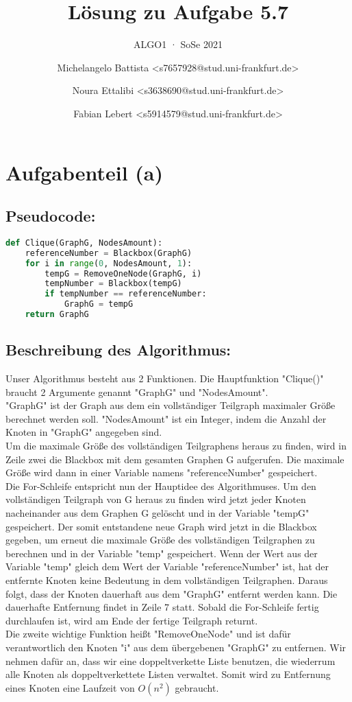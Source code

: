 \documentclass[a4paper,11pt,oneside]{scrartcl}
\subtitle{ALGO1 · SoSe 2021}
\title{Lösung zu Aufgabe 5.7}
\author{%
  Michelangelo Battista <s7657928@stud.uni-frankfurt.de>
  \and Noura Ettalibi <s3638690@stud.uni-frankfurt.de>\and 
Fabian Lebert <s5914579@stud.uni-frankfurt.de>
}
\begin{document}
\maketitle
\section*{Aufgabenteil (a)}
\subsection*{Pseudocode:}
\begin{lstlisting}[language=Python]
def Clique(GraphG, NodesAmount):
    referenceNumber = Blackbox(GraphG)
    for i in range(0, NodesAmount, 1):
        tempG = RemoveOneNode(GraphG, i)
        tempNumber = Blackbox(tempG)
        if tempNumber == referenceNumber:
            GraphG = tempG
    return GraphG
\end{lstlisting}
\subsection* {Beschreibung des Algorithmus:}
Unser Algorithmus besteht aus 2 Funktionen. Die Hauptfunktion "Clique()" braucht 2 Argumente genannt "GraphG" und "NodesAmount".\\
"GraphG" ist der Graph aus dem ein vollständiger Teilgraph maximaler Größe berechnet werden soll. "NodesAmount" ist ein Integer, indem die Anzahl der Knoten in "GraphG" angegeben sind.\\
Um die maximale Größe des vollständigen Teilgraphens heraus zu finden, wird in Zeile zwei die Blackbox mit dem gesamten Graphen G aufgerufen. Die maximale Größe wird dann in einer Variable namens "referenceNumber" gespeichert.\\
Die For-Schleife entspricht nun der Hauptidee des Algorithmuses. Um den vollständigen Teilgraph von G heraus zu finden wird jetzt jeder Knoten nacheinander aus dem Graphen G gelöscht und in der Variable "tempG" gespeichert. Der somit entstandene neue Graph wird jetzt in die Blackbox gegeben, um erneut die maximale Größe des vollständigen Teilgraphen zu berechnen und in der Variable "temp" gespeichert. Wenn der Wert aus der Variable "temp" gleich dem Wert der Variable "referenceNumber" ist, hat der entfernte Knoten keine Bedeutung in dem vollständigen Teilgraphen. Daraus folgt, dass der Knoten dauerhaft aus dem "GraphG" entfernt werden kann. Die dauerhafte Entfernung findet in Zeile 7 statt. Sobald die For-Schleife fertig durchlaufen ist, wird am Ende der fertige Teilgraph returnt.\\
Die zweite wichtige Funktion heißt "RemoveOneNode" und ist dafür verantwortlich den Knoten "i" aus dem übergebenen "GraphG" zu entfernen. Wir nehmen dafür an, dass wir eine doppeltverkette Liste benutzen, die wiederrum alle Knoten als doppeltverkettete Listen verwaltet. Somit wird zu Entfernung eines Knoten eine Laufzeit von $O(n^2)$ gebraucht.
\end{document}

